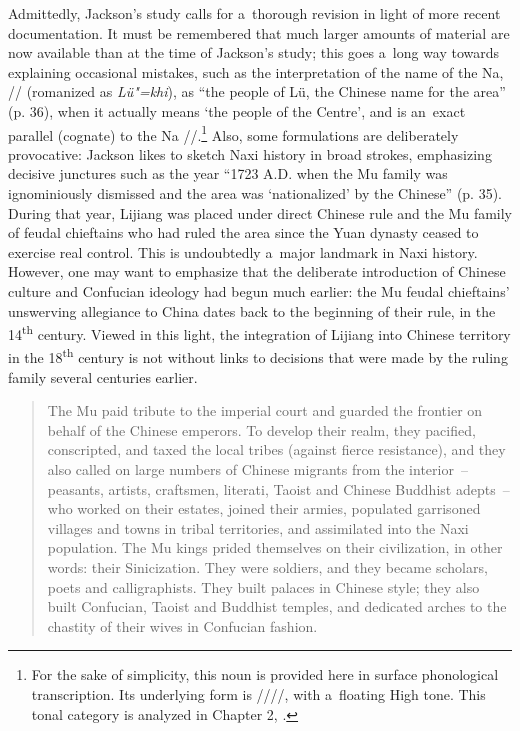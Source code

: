 Admittedly, Jackson’s study calls for a~thorough revision in light of more recent
documentation. It must be remembered that much larger amounts of material are now available than at
the time of Jackson’s study; this goes a~long way towards explaining occasional mistakes, such as
the interpretation of the  name of the Na, // (romanized as \textit{Lü"=khi}), as
“the people of Lü, the Chinese name for the area” (p. 36), when it actually means ‘the people of the
Centre’, and is an~exact parallel (cognate) to the Na  //.\footnote{For the sake of simplicity, this noun is provided here in surface phonological transcription. Its underlying form is ////, with a~{floating} High tone. This tonal category is analyzed in Chapter 2, .} Also, some
formulations are deliberately provocative: Jackson likes to sketch {Naxi} history in broad strokes,
emphasizing decisive junctures such as the year “1723 A.D. when the Mu family was ignominiously
dismissed and the area was ‘nationalized’ by the Chinese” (p. 35). During that year, Lijiang was
placed under direct Chinese rule and the Mu  family of feudal chieftains who had ruled the area since
the Yuan dynasty ceased to exercise real control. This is undoubtedly a~major landmark in {Naxi}
history. However, one may want to emphasize that the deliberate introduction of Chinese culture and
Confucian ideology had begun much earlier: the Mu feudal chieftains’ unswerving allegiance to China dates
back to the beginning of their rule, in the 14\textsuperscript{th} century. Viewed in this light, the integration of
Lijiang into Chinese territory in the 18\textsuperscript{th} century is not without links to decisions that were
made by the ruling family several centuries earlier.

\begin{quotation}
	The Mu paid tribute to the imperial court and guarded the frontier on behalf of the Chinese emperors. To develop their realm, they pacified, conscripted, and taxed the local tribes (against fierce resistance), and they also called on large numbers of Chinese migrants from the interior~– peasants, artists, craftsmen, literati, Taoist and Chinese Buddhist adepts~– who worked on their estates, joined their armies, populated garrisoned villages and towns in tribal territories, and assimilated into the {Naxi} population. The Mu kings prided themselves on their civilization, in other words: their Sinicization. They were soldiers, and they became scholars, poets and calligraphists.  They built palaces in Chinese style; they also built Confucian, Taoist and Buddhist temples, and dedicated arches to the chastity of their wives in Confucian fashion. \citep[359-360]{mathieu2015}
\end{quotation}


